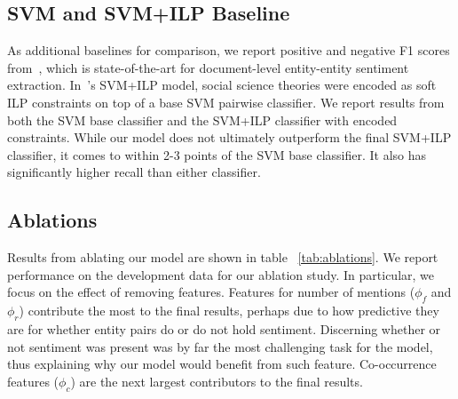 \documentclass[11pt,a4paper]{article}
\begin{document}
\subsection{SVM and SVM+ILP Baseline}
As additional baselines for comparison, we report positive and negative F1 scores from~, which is state-of-the-art for document-level entity-entity sentiment extraction.
In~'s SVM+ILP model, social science theories were encoded as soft ILP constraints on top of a base SVM pairwise classifier.
We report results from both the SVM base classifier and the SVM+ILP classifier with encoded constraints.
While our model does not ultimately outperform the final SVM+ILP classifier, it comes to within 2-3 points of the SVM base classifier.
It also has significantly higher recall than either classifier.


\subsection{Ablations}
Results from ablating our model are shown in table ~\ref{tab:ablations}.
We report performance on the development data for our ablation study.
In particular, we focus on the effect of removing features.
Features for number of mentions ($\phi_f$ and $\phi_r$) contribute the most to the final results, perhaps due to how predictive they are for whether entity pairs do or do not hold sentiment.
Discerning whether or not sentiment was present was by far the most challenging task for the model, thus explaining why our model would benefit from such feature.
Co-occurrence features ($\phi_c$) are the next largest contributors to the final results.
\end{document}
